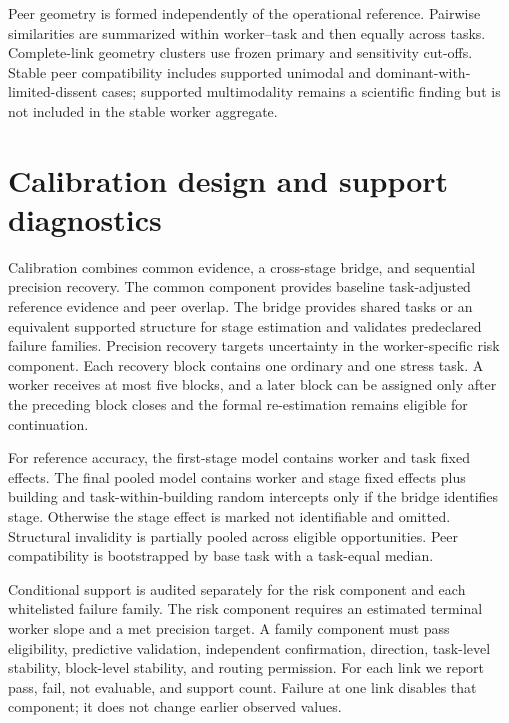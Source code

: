 \documentclass[preprint,12pt]{elsarticle}
\begin{document}
Peer geometry is formed independently of the operational reference. Pairwise similarities are summarized within worker--task and then equally across tasks. Complete-link geometry clusters use frozen primary and sensitivity cut-offs. Stable peer compatibility includes supported unimodal and dominant-with-limited-dissent cases; supported multimodality remains a scientific finding but is not included in the stable worker aggregate.

\section{Calibration design and support diagnostics}
\label{sup:calibration}

Calibration combines common evidence, a cross-stage bridge, and sequential precision recovery. The common component provides baseline task-adjusted reference evidence and peer overlap. The bridge provides shared tasks or an equivalent supported structure for stage estimation and validates predeclared failure families. Precision recovery targets uncertainty in the worker-specific risk component. Each recovery block contains one ordinary and one stress task. A worker receives at most five blocks, and a later block can be assigned only after the preceding block closes and the formal re-estimation remains eligible for continuation.

For reference accuracy, the first-stage model contains worker and task fixed effects. The final pooled model contains worker and stage fixed effects plus building and task-within-building random intercepts only if the bridge identifies stage. Otherwise the stage effect is marked not identifiable and omitted. Structural invalidity is partially pooled across eligible opportunities. Peer compatibility is bootstrapped by base task with a task-equal median.

Conditional support is audited separately for the risk component and each whitelisted failure family. The risk component requires an estimated terminal worker slope and a met precision target. A family component must pass eligibility, predictive validation, independent confirmation, direction, task-level stability, block-level stability, and routing permission. For each link we report pass, fail, not evaluable, and support count. Failure at one link disables that component; it does not change earlier observed values.
\end{document}
